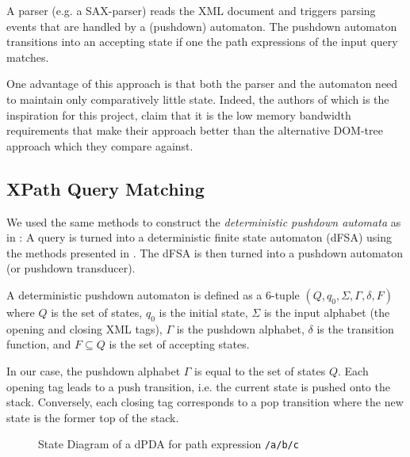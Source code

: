 A parser (e.g. a SAX-parser) reads the XML document and triggers parsing events
that are handled by a (pushdown) automaton. The pushdown automaton transitions
into an accepting state if one the path expressions of the input query matches.

One advantage of this approach is that both the parser and the automaton need to
maintain only comparatively little state. Indeed, the authors of
\cite{Ogden2013} which is the inspiration for this project, claim that it is the
low memory bandwidth requirements that make their approach better than the
alternative DOM-tree approach which they compare against.

\subsection{XPath Query Matching}
We used the same methods to construct the \emph{deterministic pushdown automata}
as in \cite{Ogden2013}: A query is turned into a deterministic finite state
automaton (dFSA) using the methods presented in \cite{Green2014}. The dFSA is
then turned into a pushdown automaton (or pushdown transducer).

A deterministic pushdown automaton is defined as a 6-tuple $(Q, q_0, \Sigma,
\Gamma, \delta, F)$ where $Q$ is the set of states, $q_0$ is the initial state,
$\Sigma$ is the input alphabet (the opening and closing XML tags), $\Gamma$ is
the pushdown alphabet, $\delta$ is the transition function, and $F \subseteq Q$ is
the set of accepting states.

In our case, the pushdown alphabet $\Gamma$ is equal to the set of states $Q$.
Each opening tag leads to a push transition, i.e. the current state is pushed
onto the stack. Conversely, each closing tag corresponds to a pop transition
where the new state is the former top of the stack.


\begin{figure}
\centering
{}
\caption{State Diagram of a dPDA for path expression \texttt{/a/b/c}}
\label{fig:exampleFSA}
\end{figure}

